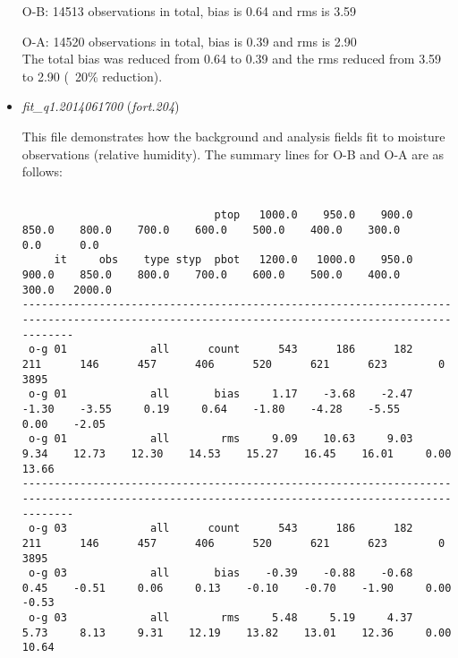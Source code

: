 \begin{itemize}[leftmargin=*]
\begin{tiny}
\begin{verbatim}
\end{verbatim}
\end{tiny}

	\hspace{1cm} O-B: 14513 observations in total, bias is 0.64 and rms is 3.59

	\hspace{1cm} O-A: 14520 observations in total, bias is 0.39 and rms is 2.90\\
The total bias was reduced from 0.64 to 0.39 and the rms reduced from 3.59 to 2.90 (~20\% reduction).\\


\item \textit{fit\_q1.2014061700} (\textit{fort.204})

This file demonstrates how the background and analysis fields fit to moisture observations (relative humidity). The summary lines for O-B and O-A are as follows:

\begin{tiny}
\begin{verbatim}

                              ptop   1000.0    950.0    900.0    850.0    800.0    700.0    600.0    500.0    400.0    300.0      0.0      0.0
     it     obs    type styp  pbot   1200.0   1000.0    950.0    900.0    850.0    800.0    700.0    600.0    500.0    400.0    300.0   2000.0
----------------------------------------------------------------------------------------------------------------------------------------------
 o-g 01             all      count      543      186      182      211      146      457      406      520      621      623        0     3895
 o-g 01             all       bias     1.17    -3.68    -2.47    -1.30    -3.55     0.19     0.64    -1.80    -4.28    -5.55     0.00    -2.05
 o-g 01             all        rms     9.09    10.63     9.03     9.34    12.73    12.30    14.53    15.27    16.45    16.01     0.00    13.66
----------------------------------------------------------------------------------------------------------------------------------------------
 o-g 03             all      count      543      186      182      211      146      457      406      520      621      623        0     3895
 o-g 03             all       bias    -0.39    -0.88    -0.68     0.45    -0.51     0.06     0.13    -0.10    -0.70    -1.90     0.00    -0.53
 o-g 03             all        rms     5.48     5.19     4.37     5.73     8.13     9.31    12.19    13.82    13.01    12.36     0.00    10.64


\end{verbatim}
\end{tiny}
\end{itemize}
